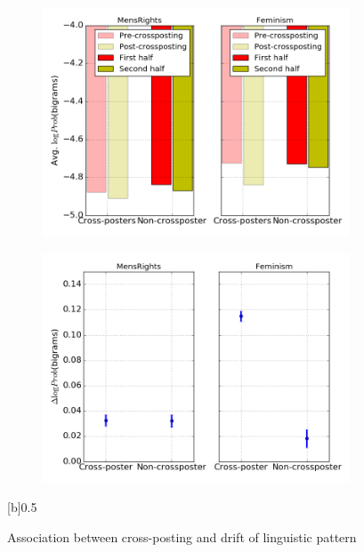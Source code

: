 \documentclass{article}
\begin{document}
\begin{figure}
    \centering
    \begin{subfigure}[b]{0.5\textwidth}
        \includegraphics{images/LM_figure_1_1.png}
        \label{lm:fig1_1}
    \end{subfigure}
    \begin{subfigure}[b]{0.5\textwidth}
        \includegraphics{images/LM_figure_1_2.png}
        \label{lm:fig1_2}
    \end{subfigure}[b]{0.5\textwidth}
    \caption{Association between cross-posting and drift of linguistic pattern}
\end{figure}
\end{document}
